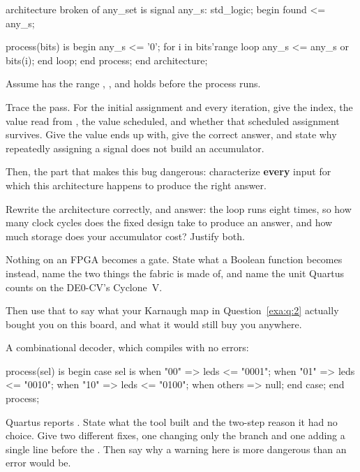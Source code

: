 \begin{vhdlcode}
architecture broken of any_set is
signal any_s: std_logic;
begin
    found <= any_s;

    process(bits) is
    begin
        any_s <= '0';
        for i in bits'range loop
            any_s <= any_s or bits(i);
        end loop;
    end process;
end architecture;
\end{vhdlcode}

\noindent Assume  has the range , , and
 holds  before the process runs.

Trace the pass. For the initial assignment and every iteration, give the index, the value read from
, the value scheduled, and whether that scheduled assignment survives. Give the value
 ends up with, give the correct answer, and state why repeatedly assigning a signal does
not build an accumulator.

Then, the part that makes this bug dangerous: characterize \textbf{every} input for which this
architecture happens to produce the right answer. 

 Rewrite the architecture correctly, and answer: the loop runs eight times, so how many
clock cycles does the fixed design take to produce an answer, and how much storage does your
accumulator cost? Justify both. 

 Nothing on an FPGA becomes a gate. State what a Boolean function becomes instead, name the
two things the fabric is made of, and name the unit Quartus counts on the DE0-CV's Cyclone~V.

Then use that to say what your Karnaugh map in Question~\ref{exa:q:2} actually bought you on this
board, and what it would still buy you anywhere. 

 A combinational decoder, which compiles with no errors:

\begin{vhdlcode}
process(sel) is
begin
    case sel is
        when "00"   => leds <= "0001";
        when "01"   => leds <= "0010";
        when "10"   => leds <= "0100";
        when others => null;
    end case;
end process;
\end{vhdlcode}

\noindent Quartus reports . State what the tool
built and the two-step reason it had no choice. Give two different fixes, one changing only the
 branch and one adding a single line before the . Then say why a
warning here is more dangerous than an error would be. 

